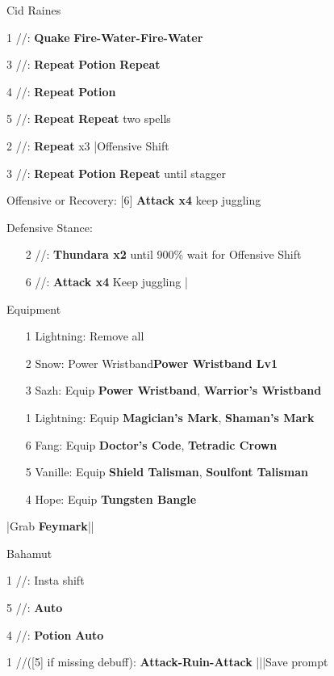 \begin{fight}{Cid Raines}
	\item [1] \rav/\sen/\syn: \textbf{Quake} \to \textbf{Fire-Water-Fire-Water}
	\item [3] \rav/\sen/\rav: \textbf{Repeat} \to \textbf{Potion} \to \textbf{Repeat}
	\item [4] \rav/\sen/\rav: \textbf{Repeat} \to \textbf{Potion}
	\item [5] \rav/\rav/\syn: \textbf{Repeat} \to \textbf{Repeat} two spells
	\item [2] \rav/\rav/\rav: \textbf{Repeat} x3 |Offensive Shift
	\item [3] \rav/\sen/\rav: \textbf{Repeat} \to \textbf{Potion} \to \textbf{Repeat} until stagger
	\item Offensive or Recovery: [6] \textbf{Attack x4} \to keep juggling
	\item Defensive Stance:
	\begin{itemize}
		\item [2] \rav/\rav/\rav: \textbf{Thundara x2} until 900\% \to wait for Offensive Shift
		\item [6] \com/\com/\rav: \textbf{Attack x4} \to Keep juggling |\skip
	\end{itemize}
\end{fight}
\begin{menu}
	\item Equipment
	\begin{itemize}
		\item [1] Lightning: Remove all
		\item [2] Snow: Power Wristband\star \to \textbf{Power Wristband Lv1}
		\item [3] Sazh: Equip \textbf{Power Wristband\star}, \textbf{Warrior's Wristband}
		\item [1] Lightning: Equip \textbf{Magician's Mark}, \textbf{Shaman's Mark}
		\item [6] Fang: Equip \textbf{Doctor's Code}, \textbf{Tetradic Crown}
		\item [5] Vanille: Equip \textbf{Shield Talisman}, \textbf{Soulfont Talisman}
		\item [4] Hope: Equip \textbf{Tungsten Bangle}
	\end{itemize}
\end{menu}
\begin{mainlist}
	\item \skip|Grab \textbf{Feymark}|\skip|
\end{mainlist}
\begin{fight}{Bahamut}
	\item [1] \com/\rav/\rav: Insta shift
	\item [5] \sab/\com/\rav: \textbf{Auto}
	\item [4] \sen/\med/\med: \textbf{Potion} \to \textbf{Auto}
	\item [1] \com/\rav/\rav ([5] if missing debuff): \textbf{Attack-Ruin-Attack} |\skip||Save prompt
\end{fight}
